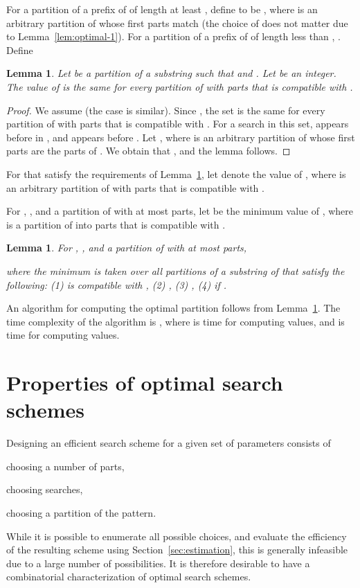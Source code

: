 \documentclass[12pt]{article}
\newtheorem{lemma}[theorem]{Lemma}
\begin{document}
For a partition  of a prefix of  of length at least ,
define  to be 
,
where  is an arbitrary partition of  whose first
 parts match 
(the choice of  does not matter due to Lemma~\ref{lem:optimal-1}).
For a partition  of a prefix of  of length less than ,
.
Define


\begin{lemma}\label{lem:optimal-2}
Let  be a partition of a substring 
such that  and
.
Let  be an integer.
The value of  is the same for
every partition  of  with  parts
that is compatible with .
\end{lemma}
\begin{proof}
We assume  (the case
 is similar).
Since ,
the set  is the
same for every partition  of  with  parts
that is compatible with .
For a search  in this set,  appears before
 in ,
and  appears before .
Let , 
where  is an arbitrary partition of  whose first
 parts are the parts of .
We obtain that 
,
and the lemma follows.
\end{proof}

For  that satisfy the requirements of
Lemma~\ref{lem:optimal-2}, let  denote the value of
, where  is an arbitrary partition of
 with  parts that is compatible with .

For , , and a partition  of
 with at most  parts,
let  be the minimum value of ,
where  is a partition of  into  parts
that is compatible with .
\begin{lemma}\label{lem:optimal-3}
For , , and a partition  of
 with at most  parts,

where the minimum is taken over all partitions 
of a substring  of  that satisfy the following:
(1)  is compatible with ,
(2) ,
(3) ,
(4)  if .
\end{lemma}
An algorithm for computing the optimal partition follows from
Lemma~\ref{lem:optimal-3}.
The time complexity of the algorithm is
, where
 is time for
computing  values, and  is time
for computing  values. 

\section{Properties of optimal search schemes}\label{sec:design}

Designing an efficient search scheme for a given set of parameters consists
of
\begin{inparaenum}[(1)]
\item choosing a number of parts,
\item choosing searches, \item choosing a partition of the pattern.
\end{inparaenum}
While it is possible to enumerate all possible choices, and 
evaluate the efficiency of the resulting scheme using
Section~\ref{sec:estimation}, this is generally infeasible due to a large
number of possibilities.
It is therefore desirable to have a combinatorial characterization of
optimal search schemes.
\end{document}
